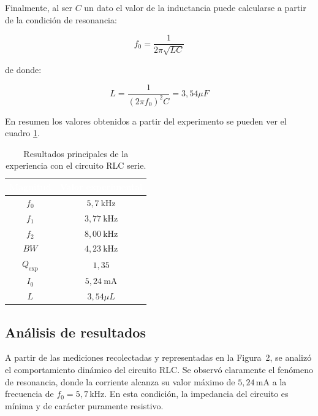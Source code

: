Finalmente, al ser $C$ un dato el valor de la inductancia puede calcularse a partir de la
condición de resonancia:

\begin{equation}
    f_0=\frac{1}{2\pi\sqrt{LC}}
\end{equation}

de donde:

\begin{equation}
    L=\frac{1}{(2\pi f_0)^2C}=3,54 \mu F
    \label{eq:inductancia_resonancia}
\end{equation}

En resumen los valores obtenidos a partir del experimento se pueden ver el cuadro \ref{tab:resultados_rlc_serie}.

\begin{table}[H]
    \centering
    \renewcommand{\arraystretch}{1.3}
    \begin{tabular}{|c|c|}
        \hline
        \rowcolor{headercolor}
        \textcolor{white}{\textbf{Magnitud}} &
        \textcolor{white}{\textbf{Valor experimental}} \\
        \hline
        \rowcolor{rowcolor}
         $f_0$ & $5{,}7\ \mathrm{kHz}$ \\
        \hline
        $f_1$ & $3{,}77\ \mathrm{kHz}$ \\
        \hline
        \rowcolor{rowcolor}
         $f_2$ & $8{,}00\ \mathrm{kHz}$ \\
        \hline
         $BW$ & $4{,}23\ \mathrm{kHz}$ \\
        \hline
        \rowcolor{rowcolor}
        $Q_{\mathrm{exp}}$ & $1{,}35$ \\
        \hline
        $I_0$ & $5{,}24\ \mathrm{mA}$ \\
        \hline
        \rowcolor{rowcolor}
        $L$ & $3{,}54 \mu L$ \\
        \hline
    \end{tabular}
    \caption{Resultados principales de la experiencia con el circuito RLC
    serie.}
    \label{tab:resultados_rlc_serie}
\end{table}

\newpage
\subsection{Análisis de resultados}
                                                
A partir de las mediciones recolectadas y representadas en la Figura~2, se analizó el comportamiento dinámico del circuito RLC. Se observó claramente el fenómeno de resonancia, donde la corriente alcanza su valor máximo de \(5{,}24\,\text{mA}\) a la frecuencia de \(f_0 = 5{,}7\,\text{kHz}\). En esta condición, la impedancia del circuito es mínima y de carácter puramente resistivo.

